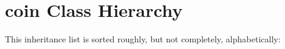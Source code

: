 \section{coin Class Hierarchy}
This inheritance list is sorted roughly, but not completely, alphabetically:\begin{CompactList}
\item {}
\end{CompactList}
